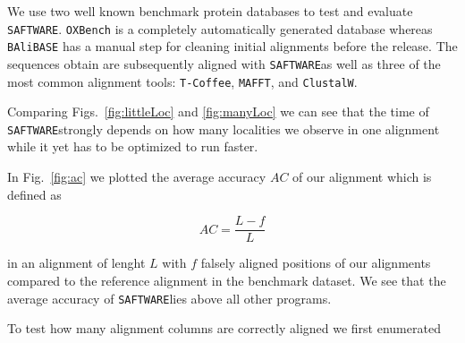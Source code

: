 \documentclass[a4paper,10pt]{article}
\newcommand{\TODO}[1]{\begingroup\color{red}#1\endgroup}
\newcommand{\NR}[1]{\begingroup\color{orange}#1\endgroup}
\newcommand{\SAFTWARE}{\TODO{\texttt{SAFTWARE}}}
\begin{document}
We use two well known benchmark protein databases to test and evaluate
\SAFTWARE. \texttt{OXBench} \cite{oxbench} is a completely automatically
generated database whereas \texttt{BAliBASE} \cite{balibase} has a manual
step for cleaning initial alignments before the release. \NR{The sequences obtain are subsequently aligned with \SAFTWARE as well as three of the most common alignment tools: \texttt{T-Coffee}, \texttt{MAFFT}, and \texttt{ClustalW}.

Comparing Figs.~\ref{fig:littleLoc} and \ref{fig:manyLoc} we can see that the time of \SAFTWARE strongly depends on how many localities we observe in one alignment while it yet has to be optimized to run faster. 

In Fig.~\ref{fig:ac} we plotted the average accuracy $AC$ of our alignment which is defined as

\begin{equation*}
 AC = \frac{L - f}{L}
\end{equation*}

in an alignment of lenght $L$ with $f$ falsely aligned positions of our alignments compared to the reference alignment in the benchmark dataset. We see that the average accuracy of \SAFTWARE lies above all other programs.  

To test how many alignment columns are correctly aligned we first enumerated }
\end{document}
